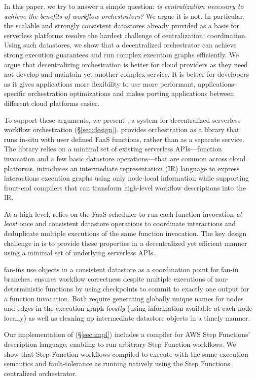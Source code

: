 In this paper, we try to answer a simple question: \textit{is centralization
\emph{necessary} to achieve the benefits of workflow  orchestrators?} We argue
it is not. In particular, the scalable and strongly consistent datastores
already provided as a basis for serverless platforms resolve the hardest
challenge of centralization: coordination. Using such datastores, we show that a
decentralized orchestrator can achieve strong execution guarantees and run
complex execution graphs efficiently. We argue that decentralizing orchestration
is better for cloud providers as they need not develop and maintain yet another
complex service. It is better for developers as it gives applications more
flexibility to use more performant, applications-specific orchestration
optimizations and makes porting applications between different cloud platforms
easier.

To support these arguments, we present \name{}, a system for decentralized
serverless workflow orchestration (\S\ref{sec:design}). \name{} provides
orchestration as a library that runs in-situ with user defined FaaS functions,
rather than as a separate service. The library relies on a minimal set of
existing serverless APIs---function invocation and a few basic datastore
operations---that are common across cloud platforms. \name{} introduces an
intermediate representation (IR) language to express interactions execution
graphs using only node-local information while supporting front-end compilers
that can transform high-level workflow descriptions into the IR.

At a high level, \name{} relies on the FaaS scheduler to run each function
invocation \emph{at least} once and consistent datastore operations to
coordinate interactions and deduplicate multiple executions of the same function
invocation. The key design challenge in \name{} is to provide these properties
in a decentralized yet efficient manner using a minimal set of underlying
serverless APIs.

\name{} fan-ins use objects in a consistent datastore as a coordination point
for fan-in branches. \name{} ensures workflow correctness despite multiple
executions of non-deterministic functions by using checkpoints to commit to
exactly one output for a function invocation. Both require generating globally
unique names for nodes and edges in the execution graph \emph{locally} (using
information available at each node locally) as well as cleaning up intermediate
datastore objects in a timely manner.

Our implementation of \name{} (\S\ref{sec:impl}) includes a compiler for AWS Step
Functions' description language, enabling \name{} to run arbitrary Step Function
workflows.  We show that Step Function workflows compiled to \name{} execute
with the same execution semantics and fault-tolerance as running natively using
the Step Functions centralized orchestrator.


